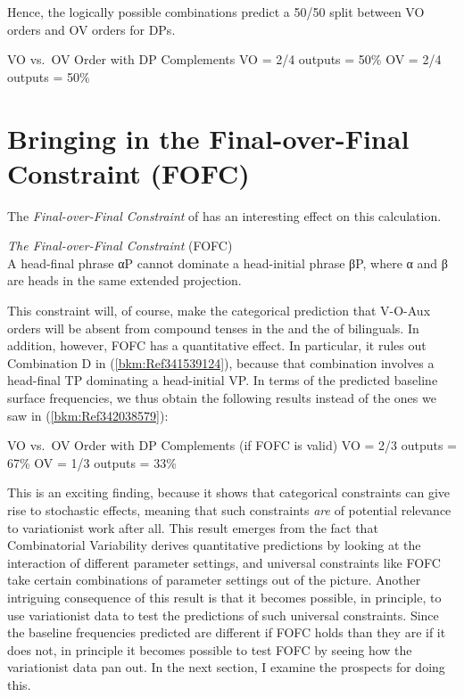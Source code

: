 \documentclass[output=paper]{langsci/langscibook}
\begin{document}
Hence, the logically possible combinations predict a 50/50 split between VO
orders and OV orders for DPs.

\ea\label{bkm:Ref342038579}VO vs.\ OV Order with DP Complements
    \sn VO = 2/4 outputs = 50\%
    \sn OV = 2/4 outputs = 50\%
\z

\section{Bringing in the Final-over-Final Constraint (FOFC)}\label{sec-30:key:2}

The \emph{Final-over-Final Constraint} of \textcite[171]{BibHolRob2014} has an
interesting effect on this calculation.

\ea \emph{The Final-over-Final Constraint} (FOFC)\\
    A head-final phrase αP cannot dominate a head-initial phrase βP, where α
    and β are heads in the same extended projection.
\z

This constraint will, of course, make the categorical prediction that V-O-Aux
orders will be absent from compound tenses in the  and the  of
bilinguals.  In addition, however, \gls{FOFC} has a quantitative effect.  In
particular, it rules out Combination D in (\ref{bkm:Ref341539124}), because
that combination involves a head-final TP dominating a head-initial VP.  In
terms of the predicted baseline surface frequencies, we thus obtain the
following results instead of the ones we saw in (\ref{bkm:Ref342038579}):

\ea VO vs.\ OV Order with DP Complements (if \gls{FOFC} is valid)
    \sn VO = 2/3 outputs = 67\%
    \sn OV = 1/3 outputs = 33\%
\z

This is an exciting finding, because it shows that categorical constraints can
give rise to stochastic effects, meaning that such constraints \emph{are} of
potential relevance to variationist work after all.  This result emerges from
the fact that Combinatorial Variability derives quantitative predictions by
looking at the interaction of different parameter settings, and universal
constraints like \gls{FOFC} take certain combinations of parameter settings out of
the picture.  Another intriguing consequence of this result is that it becomes
possible, in principle, to use variationist data to test the predictions of
such universal constraints.  Since the baseline frequencies predicted are
different if \gls{FOFC} holds than they are if it does not, in principle it becomes
possible to test \gls{FOFC} by seeing how the variationist data pan out.  In the next
section, I examine the prospects for doing this.
\end{document}
